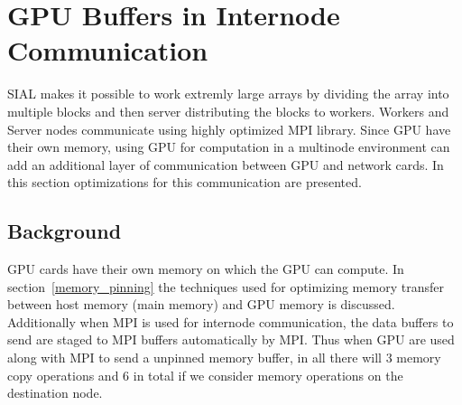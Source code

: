 \section{GPU Buffers in Internode Communication}
SIAL makes it possible to work extremly large arrays by dividing the array into
multiple blocks and then server distributing the blocks to workers. Workers and
Server nodes communicate using highly optimized MPI library. Since GPU have their
own memory, using GPU for computation in a multinode environment can add an
additional layer of communication between GPU and network cards. In this section
optimizations for this communication are presented.

\subsection{Background}
GPU cards have their own memory on which the GPU can compute. In
section~\ref{memory_pinning} the techniques used for optimizing memory transfer
between host memory (main memory) and GPU memory is discussed. Additionally when
MPI is used for internode communication, the data buffers to send are staged
to MPI buffers automatically by MPI. Thus when GPU are used along with MPI to send
a unpinned memory buffer, in all there will 3 memory copy operations and 6 in
total if we consider memory operations on the destination node.

